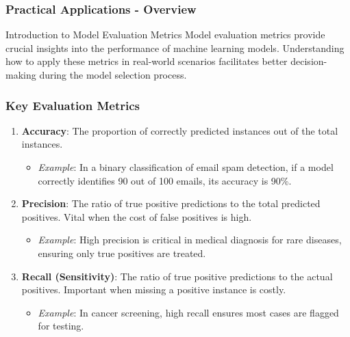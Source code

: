 \documentclass[aspectratio=169]{beamer}
\begin{document}
\begin{frame}[fragile]
    \frametitle{Practical Applications - Overview}
    \begin{block}{Introduction to Model Evaluation Metrics}
        Model evaluation metrics provide crucial insights into the performance of machine learning models. Understanding how to apply these metrics in real-world scenarios facilitates better decision-making during the model selection process.
    \end{block}
\end{frame}

\begin{frame}[fragile]
    \frametitle{Key Evaluation Metrics}
    \begin{enumerate}
        \item \textbf{Accuracy}: The proportion of correctly predicted instances out of the total instances.
        \begin{itemize}
            \item \textit{Example}: In a binary classification of email spam detection, if a model correctly identifies 90 out of 100 emails, its accuracy is 90\%.
        \end{itemize}

        \item \textbf{Precision}: The ratio of true positive predictions to the total predicted positives. Vital when the cost of false positives is high.
        \begin{itemize}
            \item \textit{Example}: High precision is critical in medical diagnosis for rare diseases, ensuring only true positives are treated.
        \end{itemize}
        
        \item \textbf{Recall (Sensitivity)}: The ratio of true positive predictions to the actual positives. Important when missing a positive instance is costly.
        \begin{itemize}
            \item \textit{Example}: In cancer screening, high recall ensures most cases are flagged for testing.
        \end{itemize}
    \end{enumerate}
\end{frame}
\end{document}
